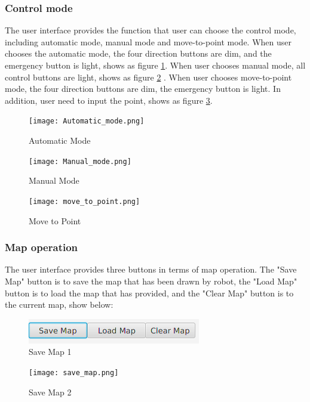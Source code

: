 \documentclass[12pt]{article}
\begin{document}
\subsubsection{Control mode}
The user interface provides the function that user can choose the control mode, including automatic mode, manual mode and move-to-point mode. When user chooses the automatic mode, the four direction buttons are dim, and the emergency button is light, shows as figure \ref{fig:Automatic_mode}. When user chooses manual mode, all control buttons are light, shows as figure \ref{fig:Manual_mode} . When user chooses move-to-point mode, the four direction buttons are dim, the emergency button is light. In addition, user need to input the point, shows as figure \ref{fig:Move_to_point_mode}.

\begin{figure}[H]
\texttt{[image: Automatic\_mode.png]}
\caption{Automatic Mode}
  \label{fig:Automatic_mode}
\end{figure}
\begin{figure}[H]
\texttt{[image: Manual\_mode.png]}
\caption{Manual Mode}
  \label{fig:Manual_mode}
\end{figure}
\begin{figure}[H]
\texttt{[image: move\_to\_point.png]}
\caption{Move to Point}
  \label{fig:Move_to_point_mode}
\end{figure}

\subsubsection{Map operation}
The user interface provides three buttons in terms of map operation. The "Save Map" button is to save the map that has been drawn by robot, the "Load Map" button is to load the map that has provided, and the "Clear Map" button is to the current map, show below:
\begin{figure}[H]
\centering
\includegraphics[width=\textwidth]{map.png}
\caption{Save Map 1 }
  \label{fig:Save_map1}
  \end{figure}
  \begin{figure}[H]
  \centering
  \texttt{[image: save\_map.png]}
  \caption{Save Map 2}
  \label{fig:Save_map2}
\end{figure}
\end{document}
